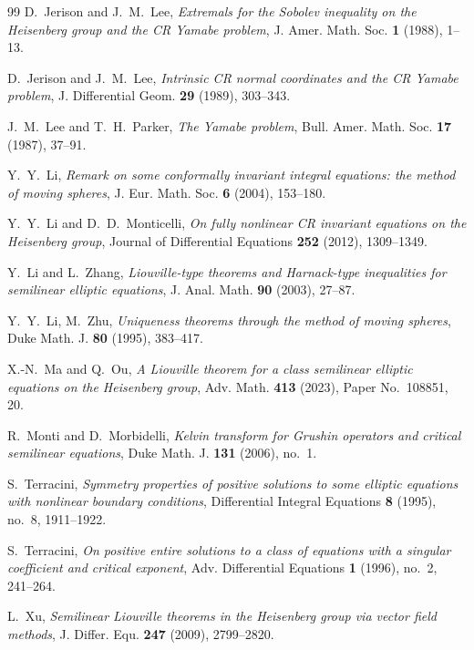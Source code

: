 \documentclass[reqno]{amsart}
\theoremstyle{definition}
\theoremstyle{remark}
\numberwithin{equation}{section}
\begin{document}
\begin{thebibliography}{99}
D.~Jerison and J.~M.~Lee,
\emph{Extremals for the Sobolev inequality on the Heisenberg group and the CR Yamabe problem},
J. Amer. Math. Soc. \textbf{1} (1988), 1--13.

D.~Jerison and J.~M.~Lee,
\emph{Intrinsic CR normal coordinates and the CR Yamabe problem},
J. Differential Geom. \textbf{29} (1989), 303--343.

J.~M.~Lee and T.~H.~Parker,
\emph{The Yamabe problem},
Bull. Amer. Math. Soc. \textbf{17} (1987), 37--91.

Y.~Y.~Li, 
\emph{Remark on some conformally invariant integral equations:
the method of moving spheres}, 
J. Eur. Math. Soc. \textbf{6} (2004), 153--180.

Y.~Y.~Li and D.~D.~Monticelli,
\emph{On fully nonlinear CR invariant equations on the Heisenberg group},
Journal of Differential Equations \textbf{252} (2012), 1309--1349.

Y.~Li and L.~Zhang,
\emph{Liouville-type theorems and Harnack-type inequalities for semilinear elliptic equations},
J. Anal. Math. \textbf{90} (2003), 27--87.

Y.~Y.~Li, M.~Zhu, 
\emph{Uniqueness theorems through the method of moving spheres}, 
Duke Math. J. \textbf{80} (1995), 383--417.

X.-N.~Ma and Q.~Ou,
\emph{A Liouville theorem for a class semilinear elliptic equations on the Heisenberg group},
Adv. Math. \textbf{413} (2023), Paper No.~108851, 20.

R.~Monti and D.~Morbidelli,
\emph{Kelvin transform for Grushin operators and critical semilinear equations},
Duke Math. J. \textbf{131} (2006), no.~1.

S.~Terracini,
\emph{Symmetry properties of positive solutions to some elliptic equations with nonlinear boundary conditions},
Differential Integral Equations \textbf{8} (1995), no.~8, 1911--1922.

S.~Terracini,
\emph{On positive entire solutions to a class of equations with a singular coefficient and critical exponent},
Adv. Differential Equations \textbf{1} (1996), no.~2, 241--264.

L.~Xu,
\emph{Semilinear Liouville theorems in the Heisenberg group via vector field methods},
J. Differ. Equ. \textbf{247} (2009), 2799--2820.

\end{thebibliography}
\end{document}
